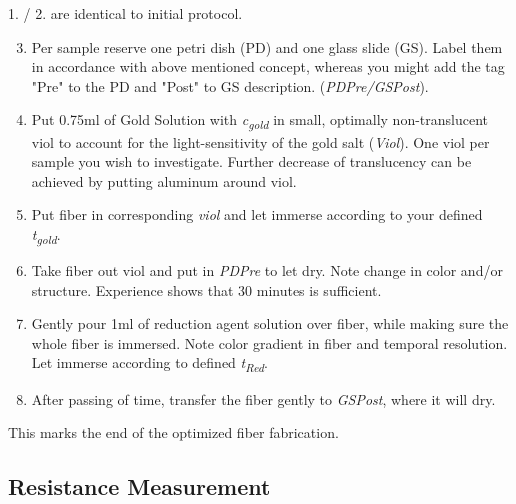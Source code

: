 \begin{appendices}
1. / 2. are identical to initial protocol.

\begin{enumerate}
	\setcounter{enumi}{2}
	
	\item Per sample reserve one petri dish (PD) and one glass slide (GS). Label them in accordance with above mentioned concept, whereas you might add the tag "Pre" to the PD and "Post" to GS description. (\textit{PDPre/GSPost}).
	
	\item Put 0.75ml of Gold Solution with \textit{c\textsubscript{gold}} in small, optimally non-translucent viol to account for the light-sensitivity of the gold salt (\textit{Viol}). One viol per sample you wish to investigate. Further decrease of translucency can be achieved by putting aluminum around viol.
	
	\item Put fiber in corresponding \textit{viol} and let immerse according to your defined \textit{t\textsubscript{gold}}.
	\item Take fiber out viol and put in \textit{PDPre} to let dry. Note change in color and/or structure. Experience shows that 30 minutes is sufficient.
	
	\item Gently pour 1ml of reduction agent solution over fiber, while making sure the whole fiber is immersed. Note color gradient in fiber and temporal resolution. Let immerse according to defined \textit{t\textsubscript{Red}}.
	
	\item After passing of time, transfer the fiber gently to \textit{GSPost}, where it will dry.
\end{enumerate}

\begin{center}
	This marks the end of the optimized fiber fabrication.
\end{center}

\subsection{Resistance Measurement}

\end{appendices}

